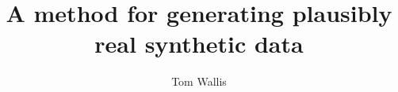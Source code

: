 \title{A method for generating plausibly real synthetic data}
\author{Tom Wallis}
\date{}


\usepackage{indentfirst}
\usepackage[obeyDraft,textsize=small]{todonotes}
\usepackage{cleveref}